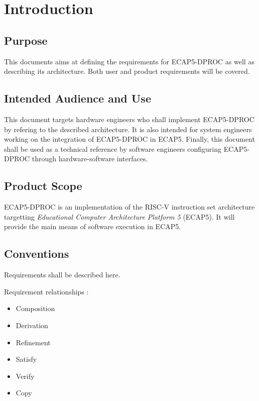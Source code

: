 \section{Introduction}
\subsection{Purpose}

\begin{content}
This documents aims at defining the requirements for ECAP5-DPROC as well as describing its architecture. Both user and product requirements will be covered.
\end{content}

\subsection{Intended Audience and Use}

\begin{content}
This document targets hardware engineers who shall implement ECAP5-DPROC by refering to the described architecture. It is also intended for system engineers working on the integration of ECAP5-DPROC in ECAP5. Finally, this document shall be used as a technical reference by software engineers configuring ECAP5-DPROC through hardware-software interfaces.
\end{content}

\subsection{Product Scope}

\begin{content}
  ECAP5-DPROC is an implementation of the RISC-V instruction set architecture targetting \textit{Educational Computer Architecture Platform 5} (ECAP5). It will provide the main means of software execution in ECAP5.
\end{content}

\subsection{Conventions}

Requirements shall be described here.

Requirement relationships :
\begin{itemize}
    \item Composition
    \item Derivation
    \item Refinement
    \item Satisfy
    \item Verify
    \item Copy
\end{itemize}

